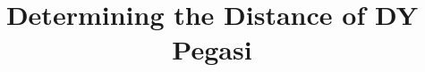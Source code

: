 \documentclass[twocolumn]{aastex631}
\begin{document}
\title{Determining the Distance of DY Pegasi}


\end{document}
